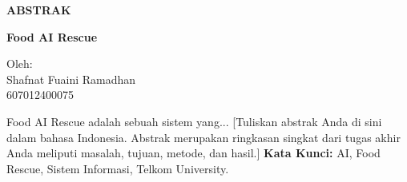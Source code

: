
\newpage
\begin{center}
    {\Large\bfseries ABSTRAK \par}
    \vspace{0.5cm}
    {\large\bfseries Food AI Rescue \par}
    \vspace{0.5cm}
    Oleh: \\
    Shafnat Fuaini Ramadhan \\
    607012400075 \\
\end{center}
\vspace{1cm}
Food AI Rescue adalah sebuah sistem yang... [Tuliskan abstrak Anda di sini dalam bahasa Indonesia. Abstrak merupakan ringkasan singkat dari tugas akhir Anda meliputi masalah, tujuan, metode, dan hasil.]
\vspace{1cm}
\noindent \textbf{Kata Kunci:} AI, Food Rescue, Sistem Informasi, Telkom University.

